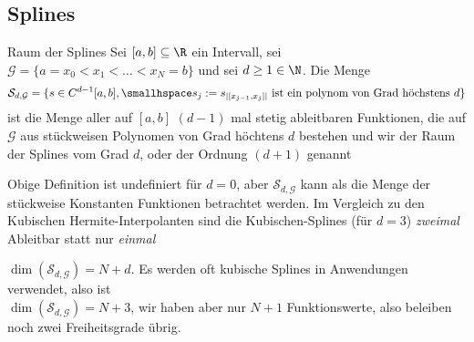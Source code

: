 
\newsectionNoPB
\subsection{Splines}
\begin{definition}[]{Raum der Splines}
    Sei $[a, b] \subseteq \R$ ein Intervall, sei $\mathcal{G} = \{ a = x_0 < x_1 < \ldots < x_N = b \}$ und sei $d \geq 1 \in \N$.
    Die Menge
    \begin{align*}
        \mathcal{S}_{d, \mathcal{G}} = \{ s \in C^{d - 1}[a, b], \smallhspace s_j := s_{|[x_{j - 1}, x_j]|} \text{ ist ein polynom von Grad höchstens } d \}
    \end{align*}
    ist die Menge aller auf $[a, b]$ $(d - 1)$ mal stetig ableitbaren Funktionen, die auf $\mathcal{G}$ aus stückweisen Polynomen von Grad höchtens $d$ bestehen
    und wir der Raum der Splines vom Grad $d$, oder der Ordnung $(d + 1)$ genannt
\end{definition}

\inlineremark Obige Definition ist undefiniert für $d = 0$, aber $\mathcal{S}_{d, \mathcal{G}}$ kann als die Menge der stückweise Konstanten Funktionen betrachtet werden.
Im Vergleich zu den Kubischen Hermite-Interpolanten sind die Kubischen-Splines (für $d = 3$) \textit{zweimal} Ableitbar statt nur \textit{einmal}

\inlineremark $\dim(\mathcal{S}_{d, \mathcal{G}}) = N + d$. Es werden oft kubische Splines in Anwendungen verwendet, also ist\\
$\dim(\mathcal{S}_{d, \mathcal{G}}) = N + 3$, wir haben aber nur $N + 1$ Funktionswerte, also beleiben noch zwei Freiheitsgrade übrig.

